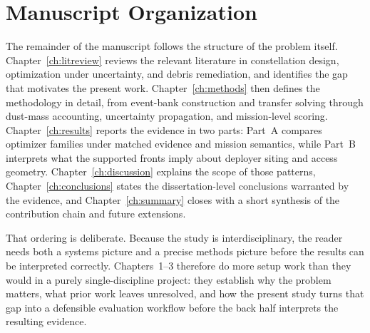 \section{Manuscript Organization}
The remainder of the manuscript follows the structure of the problem itself. Chapter~\ref{ch:litreview} reviews the relevant literature in constellation design, optimization under uncertainty, and debris remediation, and identifies the gap that motivates the present work. Chapter~\ref{ch:methods} then defines the methodology in detail, from event-bank construction and transfer solving through dust-mass accounting, uncertainty propagation, and mission-level scoring. Chapter~\ref{ch:results} reports the evidence in two parts: Part~A compares optimizer families under matched evidence and mission semantics, while Part~B interprets what the supported fronts imply about deployer siting and access geometry. Chapter~\ref{ch:discussion} explains the scope of those patterns, Chapter~\ref{ch:conclusions} states the dissertation-level conclusions warranted by the evidence, and Chapter~\ref{ch:summary} closes with a short synthesis of the contribution chain and future extensions.

That ordering is deliberate. Because the study is interdisciplinary, the reader needs both a systems picture and a precise methods picture before the results can be interpreted correctly. Chapters~1--3 therefore do more setup work than they would in a purely single-discipline project: they establish why the problem matters, what prior work leaves unresolved, and how the present study turns that gap into a defensible evaluation workflow before the back half interprets the resulting evidence.


